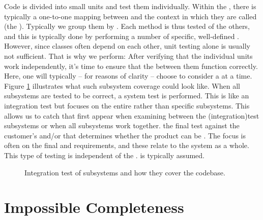 \begin{itemize}
   Code is divided into small units and test them individually. Within the , there is typically a one-to-one mapping between  and the context in which they are called (the ). Typically we group them by . Each method is thus tested  of the others, and this is typically done by performing a number of specific, well-defined . However, since classes often depend on each other, unit testing alone is usually not sufficient. That is why we perform:
   After verifying that the individual units work independently, it’s time to ensure that the  between them function correctly. Here, one will typically -- for reasons of clarity -- choose to consider a  at a time. Figure \ref{fig:test:integration} illustrates what such subsystem coverage could look like.
   When all subsystems are tested to be correct, a system test is performed. This is like an integration test but focuses on the entire  rather than specific subsystems. This allows us to catch  that first appear when examining  between the (integration)test subsystems or when all subsystems work together.
   the final test against the customer's  and/or  that determines whether the product can be . The focus is often on the final  and  requirements, and these relate to the system as a whole. This type of testing is independent of the .  is typically assumed.
\end{itemize}

\begin{figure}[tbp]
  
  \caption{Integration test of subsystems and how they cover the codebase.}
  \label{fig:test:integration}
\end{figure}

\section{Impossible Completeness}

